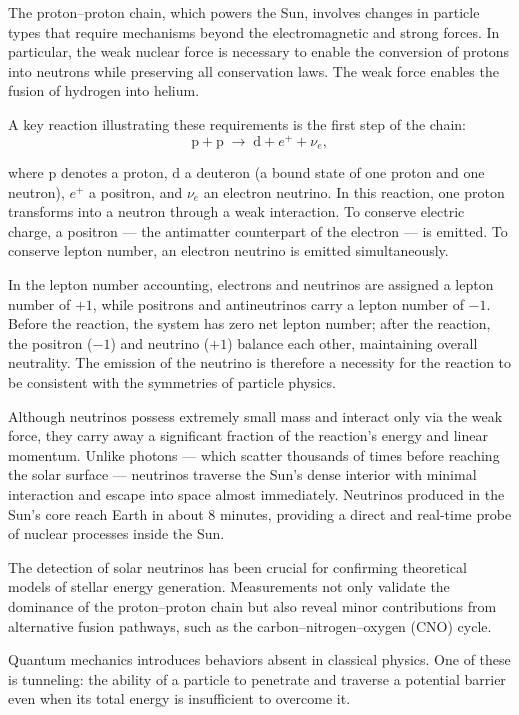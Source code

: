 The proton–proton chain, which powers the Sun, involves changes in particle types that require mechanisms beyond the electromagnetic and strong forces. In particular, the weak nuclear force is necessary to enable the conversion of protons into neutrons while preserving all conservation laws. The weak force enables the fusion of hydrogen into helium.

A key reaction illustrating these requirements is the first step of the chain:
\[
\text{p} + \text{p} \;\to\; \text{d} + e^+ + \nu_e,
\]

where $\text{p}$ denotes a proton, $\text{d}$ a deuteron (a bound state of one proton and one neutron), $e^+$ a positron, and $\nu_e$ an electron neutrino. In this reaction, one proton transforms into a neutron through a weak interaction. To conserve electric charge, a positron — the antimatter counterpart of the electron — is emitted. To conserve lepton number, an electron neutrino is emitted simultaneously. 

In the lepton number accounting, electrons and neutrinos are assigned a lepton number of $+1$, while positrons and antineutrinos carry a lepton number of $-1$. Before the reaction, the system has zero net lepton number; after the reaction, the positron ($-1$) and neutrino ($+1$) balance each other, maintaining overall neutrality. The emission of the neutrino is therefore a necessity for the reaction to be consistent with the symmetries of particle physics.

Although neutrinos possess extremely small mass and interact only via the weak force, they carry away a significant fraction of the reaction's energy and linear momentum. Unlike photons — which scatter thousands of times before reaching the solar surface — neutrinos traverse the Sun's dense interior with minimal interaction and escape into space almost immediately. Neutrinos produced in the Sun's core reach Earth in about 8 minutes, providing a direct and real-time probe of nuclear processes inside the Sun.

The detection of solar neutrinos has been crucial for confirming theoretical models of stellar energy generation. Measurements not only validate the dominance of the proton–proton chain but also reveal minor contributions from alternative fusion pathways, such as the carbon–nitrogen–oxygen (CNO) cycle.

Quantum mechanics introduces behaviors absent in classical physics. One of these is tunneling: the ability of a particle to penetrate and traverse a potential barrier even when its total energy is insufficient to overcome it. 

